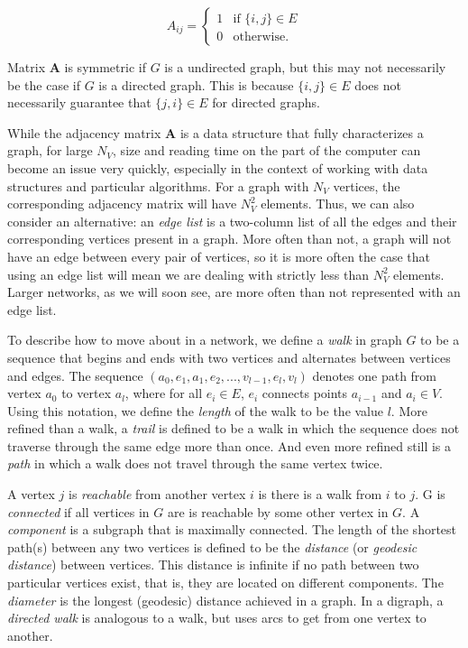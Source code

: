 \documentclass[12pt,twoside]{amherstthesis}
\begin{document}
  \[ A_{ij} = \begin{cases}
      1 & \text{if } \{i, j\} \in E \\
      0 & \text{otherwise.} 
    \end{cases}
  \]
  
  Matrix \(\textbf{A}\) is symmetric if \(G\) is a undirected graph, but
  this may not necessarily be the case if \(G\) is a directed graph. This
  is because \(\{i, j\} \in E\) does not necessarily guarantee that
  \(\{j, i\} \in E\) for directed graphs.
  
  While the adjacency matrix \(\textbf{A}\) is a data structure that fully
  characterizes a graph, for large \(N_{V}\), size and reading time on the
  part of the computer can become an issue very quickly, especially in the
  context of working with data structures and particular algorithms. For a
  graph with \(N_{V}\) vertices, the corresponding adjacency matrix will
  have \(N_{V}^{2}\) elements. Thus, we can also consider an alternative:
  an \emph{edge list} is a two-column list of all the edges and their
  corresponding vertices present in a graph. More often than not, a graph
  will not have an edge between every pair of vertices, so it is more
  often the case that using an edge list will mean we are dealing with
  strictly less than \(N_{V}^{2}\) elements. Larger networks, as we will
  soon see, are more often than not represented with an edge list.
  
  To describe how to move about in a network, we define a \emph{walk} in
  graph \(G\) to be a sequence that begins and ends with two vertices and
  alternates between vertices and edges. The sequence
  \((a_0, e_1, a_1, e_2, ..., v_{l-1}, e_l, v_l)\) denotes one path from
  vertex \(a_0\) to vertex \(a_l\), where for all \(e_i \in E\), \(e_i\)
  connects points \(a_{i-1}\) and \(a_i \in V\). Using this notation, we
  define the \emph{length} of the walk to be the value \(l\). More refined
  than a walk, a \emph{trail} is defined to be a walk in which the
  sequence does not traverse through the same edge more than once. And
  even more refined still is a \emph{path} in which a walk does not travel
  through the same vertex twice.
  
  A vertex \(j\) is \emph{reachable} from another vertex \(i\) is there is
  a walk from \(i\) to \(j\). G is \emph{connected} if all vertices in
  \(G\) are is reachable by some other vertex in \(G\). A \emph{component}
  is a subgraph that is maximally connected. The length of the shortest
  path(s) between any two vertices is defined to be the \emph{distance}
  (or \emph{geodesic distance}) between vertices. This distance is
  infinite if no path between two particular vertices exist, that is, they
  are located on different components. The \emph{diameter} is the longest
  (geodesic) distance achieved in a graph. In a digraph, a \emph{directed
  walk} is analogous to a walk, but uses arcs to get from one vertex to
  another.
  
\end{document}
